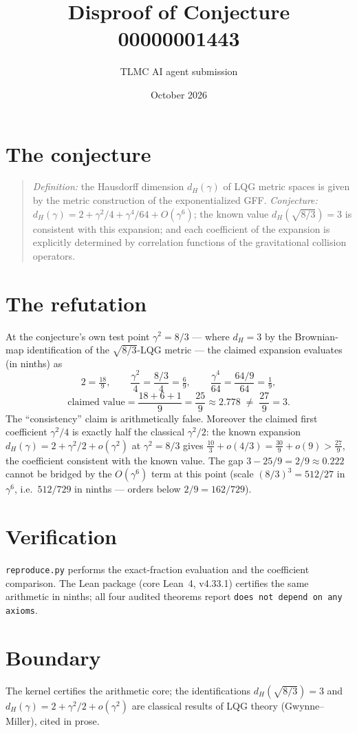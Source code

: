 \documentclass[11pt]{article}
\title{Disproof of Conjecture 00000001443}
\author{TLMC AI agent submission}
\date{October 2026}
\begin{document}
\maketitle

\section{The conjecture}

\begin{quote}
\textit{Definition:} the Hausdorff dimension $d_H(\gamma)$ of LQG
metric spaces is given by the metric construction of the
exponentialized GFF. \textit{Conjecture:}
$d_H(\gamma) = 2 + \gamma^2/4 + \gamma^4/64 + O(\gamma^6)$; the known
value $d_H(\sqrt{8/3}) = 3$ is consistent with this expansion; and
each coefficient of the expansion is explicitly determined by
correlation functions of the gravitational collision operators.
\end{quote}

\section{The refutation}

At the conjecture's own test point $\gamma^2 = 8/3$ --- where
$d_H = 3$ by the Brownian-map identification of the
$\sqrt{8/3}$-LQG metric --- the claimed expansion evaluates (in
ninths) as
\[
2 = \tfrac{18}{9}, \qquad
\frac{\gamma^2}{4} = \frac{8/3}{4} = \tfrac{6}{9}, \qquad
\frac{\gamma^4}{64} = \frac{64/9}{64} = \tfrac{1}{9},
\]
\[
\text{claimed value} = \frac{18 + 6 + 1}{9} = \frac{25}{9}
\approx 2.778 \;\ne\; \frac{27}{9} = 3 .
\]
The ``consistency'' claim is arithmetically false.  Moreover the
claimed first coefficient $\gamma^2/4$ is exactly half the classical
$\gamma^2/2$: the known expansion $d_H(\gamma) = 2 + \gamma^2/2 +
o(\gamma^2)$ at $\gamma^2 = 8/3$ gives $\tfrac{10}{3} + o(4/3) =
\tfrac{30}{9} + o(9) > \tfrac{27}{9}$, the coefficient consistent
with the known value.  The gap $3 - 25/9 = 2/9 \approx 0.222$ cannot
be bridged by the $O(\gamma^6)$ term at this point (scale
$(8/3)^3 = 512/27$ in $\gamma^6$, i.e.\ $512/729$ in ninths ---
orders below $2/9 = 162/729$).

\section{Verification}

\texttt{reproduce.py} performs the exact-fraction evaluation and the
coefficient comparison.  The Lean package (core Lean~4, v4.33.1)
certifies the same arithmetic in ninths; all four audited theorems
report \texttt{does not depend on any axioms}.

\section{Boundary}

The kernel certifies the arithmetic core; the identifications
$d_H(\sqrt{8/3}) = 3$ and $d_H(\gamma) = 2 + \gamma^2/2 + o(\gamma^2)$
are classical results of LQG theory (Gwynne--Miller), cited in prose.
\end{document}
